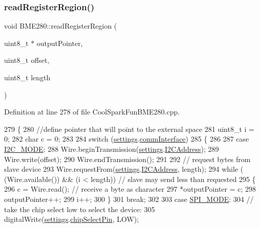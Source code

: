 \subsubsection{\texorpdfstring{read\+Register\+Region()}{readRegisterRegion()}}
{\footnotesize\ttfamily void B\+M\+E280\+::read\+Register\+Region (\begin{DoxyParamCaption}\item[{uint8\+\_\+t $\ast$}]{output\+Pointer,  }\item[{uint8\+\_\+t}]{offset,  }\item[{uint8\+\_\+t}]{length }\end{DoxyParamCaption})}



Definition at line 278 of file Cool\+Spark\+Fun\+B\+M\+E280.\+cpp.


\begin{DoxyCode}
279 \{
280     \textcolor{comment}{//define pointer that will point to the external space}
281     uint8\_t i = 0;
282     \textcolor{keywordtype}{char} c = 0;
283 
284     \textcolor{keywordflow}{switch} (\hyperlink{class_b_m_e280_af06253eb2f8ad4b5fabb858bc4a973bf}{settings}.\hyperlink{struct_sensor_settings_a5bf116387c543a6ea5732976424e8cb1}{commInterface})
285     \{
286 
287     \textcolor{keywordflow}{case} \hyperlink{_cool_spark_fun_b_m_e280_8h_a5cd01756030509b764d43a2b8c94fce8}{I2C\_MODE}:
288         Wire.beginTransmission(\hyperlink{class_b_m_e280_af06253eb2f8ad4b5fabb858bc4a973bf}{settings}.\hyperlink{struct_sensor_settings_af8103021dbce7e5ee6d786c4893324f7}{I2CAddress});
289         Wire.write(offset);
290         Wire.endTransmission();
291 
292         \textcolor{comment}{// request bytes from slave device}
293         Wire.requestFrom(\hyperlink{class_b_m_e280_af06253eb2f8ad4b5fabb858bc4a973bf}{settings}.\hyperlink{struct_sensor_settings_af8103021dbce7e5ee6d786c4893324f7}{I2CAddress}, length);
294         \textcolor{keywordflow}{while} ( (Wire.available()) && (i < length))  \textcolor{comment}{// slave may send less than requested}
295         \{
296             c = Wire.read(); \textcolor{comment}{// receive a byte as character}
297             *outputPointer = c;
298             outputPointer++;
299             i++;
300         \}
301         \textcolor{keywordflow}{break};
302 
303     \textcolor{keywordflow}{case} \hyperlink{_cool_spark_fun_b_m_e280_8h_ab1dcc9464e3fcb94922386e8a7f53f21}{SPI\_MODE}:
304         \textcolor{comment}{// take the chip select low to select the device:}
305         digitalWrite(\hyperlink{class_b_m_e280_af06253eb2f8ad4b5fabb858bc4a973bf}{settings}.\hyperlink{struct_sensor_settings_abe2de606ebb580ad81e3fafb1a454580}{chipSelectPin}, LOW);

\end{DoxyCode}
